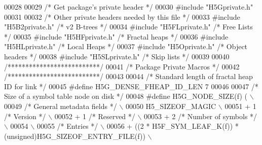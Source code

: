 \begin{DoxyCode}
00028 
00029 \textcolor{comment}{/* Get package's private header */}
00030 \textcolor{preprocessor}{#include "H5Gprivate.h"}
00031 
00032 \textcolor{comment}{/* Other private headers needed by this file */}
00033 \textcolor{preprocessor}{#include "H5B2private.h"}    \textcolor{comment}{/* v2 B-trees               */}
00034 \textcolor{preprocessor}{#include "H5FLprivate.h"}    \textcolor{comment}{/* Free Lists                           */}
00035 \textcolor{preprocessor}{#include "H5HFprivate.h"}    \textcolor{comment}{/* Fractal heaps            */}
00036 \textcolor{preprocessor}{#include "H5HLprivate.h"}    \textcolor{comment}{/* Local Heaps              */}
00037 \textcolor{preprocessor}{#include "H5Oprivate.h"}     \textcolor{comment}{/* Object headers           */}
00038 \textcolor{preprocessor}{#include "H5SLprivate.h"}    \textcolor{comment}{/* Skip lists               */}
00039 
00040 \textcolor{comment}{/**************************/}
00041 \textcolor{comment}{/* Package Private Macros */}
00042 \textcolor{comment}{/**************************/}
00043 
00044 \textcolor{comment}{/* Standard length of fractal heap ID for link */}
00045 \textcolor{preprocessor}{#define H5G\_DENSE\_FHEAP\_ID\_LEN  7}
00046 
00047 \textcolor{comment}{/* Size of a symbol table node on disk */}
00048 \textcolor{preprocessor}{#define H5G\_NODE\_SIZE(f)     (                                                \(\backslash\)}
00049 \textcolor{preprocessor}{    }\textcolor{comment}{/* General metadata fields */}\textcolor{preprocessor}{                                             \(\backslash\)}
00050 \textcolor{preprocessor}{    H5\_SIZEOF\_MAGIC                                                           \(\backslash\)}
00051 \textcolor{preprocessor}{    + 1         }\textcolor{comment}{/* Version */}\textcolor{preprocessor}{                                                 \(\backslash\)}
00052 \textcolor{preprocessor}{    + 1         }\textcolor{comment}{/* Reserved */}\textcolor{preprocessor}{                                                \(\backslash\)}
00053 \textcolor{preprocessor}{    + 2         }\textcolor{comment}{/* Number of symbols */}\textcolor{preprocessor}{                                       \(\backslash\)}
00054 \textcolor{preprocessor}{                                                                              \(\backslash\)}
00055 \textcolor{preprocessor}{    }\textcolor{comment}{/* Entries */}\textcolor{preprocessor}{                                                             \(\backslash\)}
00056 \textcolor{preprocessor}{    + ((2 * H5F\_SYM\_LEAF\_K(f)) * (unsigned)H5G\_SIZEOF\_ENTRY\_FILE(f))                    \(\backslash\)}

\end{DoxyCode}

